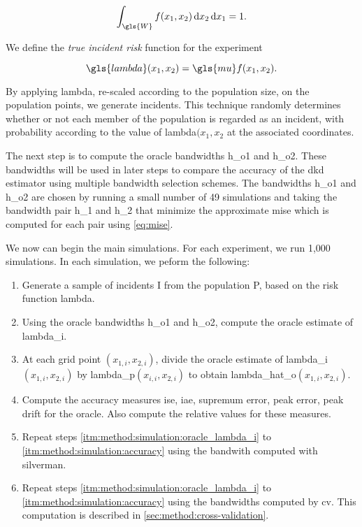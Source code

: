 \begin{equation*}
    \int_{\gls{W}} {f(x_1, x_2) \diff{x_2} \diff{x_1}} = 1
    \text{.}
\end{equation*}

We define the \textit{true incident risk} function for the experiment

\begin{equation}
    \gls{lambda}(x_1, x_2) = \gls{mu} f(x_1, x_2) \text{.}
\end{equation}

By applying \gls{lambda}, re-scaled according to the population size, on the population points, we generate incidents.
This technique randomly determines whether or not each member of the population is regarded as an incident, with probability according to the value of \gls{lambda}\((x_1, x_2\) at the associated coordinates.

The next step is to compute the \gls{oracle} bandwidths \gls{h_o1} and \gls{h_o2}.
These bandwidths will be used in later steps to compare the accuracy of the \gls{dkd} estimator using multiple bandwidth selection schemes.
The bandwidths \gls{h_o1} and \gls{h_o2} are chosen by running a small number of 49 simulations and taking the bandwidth pair \gls{h_1} and \gls{h_2} that minimize the approximate \gls{mise} which is computed for each pair using \cref{eq:mise}.

We now can begin the main simulations.
For each experiment, we run 1,000 simulations.
In each simulation, we peform the following:
\begin{enumerate}
    \item\label{itm:method:simulation:generate} Generate a sample of incidents \gls{I} from the population \gls{P}, based on the risk function \gls{lambda}.
    \item\label{itm:method:simulation:oracle_lambda_i} Using the \gls{oracle} bandwidths \gls{h_o1} and \gls{h_o2}, compute the \gls{oracle} estimate of \gls{lambda_i}.
    \item\label{itm:method:simulation:oracle_lambda_hat} At each grid point \((x_{1,i}, x_{2,i})\), divide the oracle estimate of \gls{lambda_i}\((x_{1,i}, x_{2,i})\) by \gls{lambda_p}\((x_{i,i}, x_{2,i})\) to obtain \gls{lambda_hat_o}\((x_{1,i}, x_{2,i})\).
    \item\label{itm:method:simulation:accuracy} Compute the accuracy measures \gls{ise}, \gls{iae}, \gls{supremum error}, \gls{peak error}, \gls{peak drift} for the \gls{oracle}.
    Also compute the relative values for these measures.
    \item\label{itm:method:simulation:silverman_lambda_i} Repeat steps \ref{itm:method:simulation:oracle_lambda_i} to \ref{itm:method:simulation:accuracy} using the bandwith computed with \gls{silverman}.
    \item\label{itm:method:simulation:cv_lambda_i} Repeat steps \ref{itm:method:simulation:oracle_lambda_i} to \ref{itm:method:simulation:accuracy} using the bandwidths computed by \gls{cv}.
    This computation is described in \cref{sec:method:cross-validation}.
\end{enumerate}

